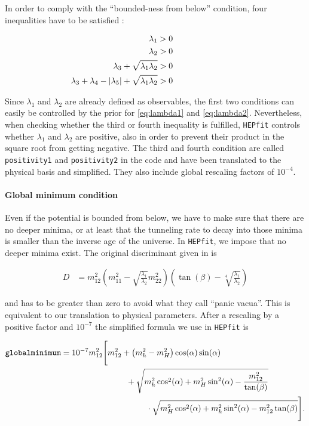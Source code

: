 \documentclass[preprint,3p,12pt]{elsarticle}
\newcommand{\HEPfit}{\texttt{HEPfit}\xspace}
\begin{document}
In order to comply with the ``bounded-ness from below'' condition, four inequalities have to be satisfied \cite{Deshpande:1977rw}:

\begin{align}
 \lambda_1&>0 \hspace*{80pt}\nonumber\\
 \lambda_2&>0 \nonumber\\
 \lambda_3 + \sqrt{\lambda_1 \lambda_2} &>0 \nonumber\\
 \lambda_3 + \lambda_4 - |\lambda_5| + \sqrt{\lambda_1 \lambda_2}&>0 \nonumber
\end{align}

Since $\lambda_1$ and $\lambda_2$ are already defined as observables, the first two conditions can easily be controlled by the prior for \eqref{eq:lambda1} and \eqref{eq:lambda2}. Nevertheless, when checking whether the third or fourth inequality is fulfilled, \HEPfit controls whether $\lambda_1$ and $\lambda_2$ are positive, also in order to prevent their product in the square root from getting negative. The third and fourth condition are called {\tt positivity1} and {\tt positivity2} in the code and have been translated to the physical basis and simplified. They also include global rescaling factors of $10^{-4}$.\\

\paragraph{Global minimum condition}

Even if the potential is bounded from below, we have to make sure that there are no deeper minima, or at least that the tunneling rate to decay into those minima is smaller than the inverse age of the universe. In \HEPfit, we impose that no deeper minima exist.
The original discriminant given in \cite{Barroso:2013awa} is

\begin{align}
 D&=m_{12}^2 \left( m_{11}^2 - \sqrt{\frac{\lambda_1}{\lambda_2}}m_{22}^2 \right) \left( \tan(\beta ) -\sqrt[4]{\frac{\lambda_1}{\lambda_2}}\right) \nonumber
\end{align}

and has to be greater than zero to avoid what they call ``panic vacua''. This is equivalent to our translation to physical parameters. After a rescaling by a positive factor and $10^{-7}$ the simplified formula we use in \HEPfit is

\begin{align}
 \tt{globalminimum} &= 10^{-7} m_{12}^2 \Bigg[ m_{12}^2 + \left( m_h^2 - m_H^2 \right) \cos (\alpha) \sin (\alpha) \phantom{Bigg]} \nonumber \\
 & \hspace*{80pt} +\sqrt{ m_h^2 \cos^2(\alpha) +m_H^2 \sin^2(\alpha) - \frac{m_{12}^2}{\tan(\beta)} } \nonumber \\
 & \hspace*{80pt} \phantom{Bigg[} \cdot \sqrt{ m_H^2 \cos^2(\alpha) +m_h^2 \sin^2(\alpha) -m_{12}^2 \tan (\beta ) } \Bigg] .\nonumber
\end{align}
\end{document}
